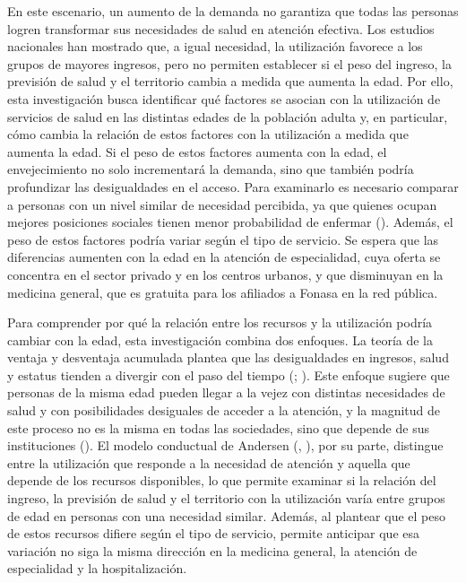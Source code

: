 \documentclass[
  spanish,
  a4paper,
  oneside]{scrbook}
\begin{document}
En este escenario, un aumento de la demanda no garantiza que todas las
personas logren transformar sus necesidades de salud en atención
efectiva. Los estudios nacionales han mostrado que, a igual necesidad,
la utilización favorece a los grupos de mayores ingresos, pero no
permiten establecer si el peso del ingreso, la previsión de salud y el
territorio cambia a medida que aumenta la edad. Por ello, esta
investigación busca identificar qué factores se asocian con la
utilización de servicios de salud en las distintas edades de la
población adulta y, en particular, cómo cambia la relación de estos
factores con la utilización a medida que aumenta la edad. Si el peso de
estos factores aumenta con la edad, el envejecimiento no solo
incrementará la demanda, sino que también podría profundizar las
desigualdades en el acceso. Para examinarlo es necesario comparar a
personas con un nivel similar de necesidad percibida, ya que quienes
ocupan mejores posiciones sociales tienen menor probabilidad de enfermar
(). Además, el peso de estos factores podría variar según el
tipo de servicio. Se espera que las diferencias aumenten con la edad en
la atención de especialidad, cuya oferta se concentra en el sector
privado y en los centros urbanos, y que disminuyan en la medicina
general, que es gratuita para los afiliados a Fonasa en la red pública.

Para comprender por qué la relación entre los recursos y la utilización
podría cambiar con la edad, esta investigación combina dos enfoques. La
teoría de la ventaja y desventaja acumulada plantea que las
desigualdades en ingresos, salud y estatus tienden a divergir con el
paso del tiempo (; ).
Este enfoque sugiere que personas de la misma edad pueden llegar a la
vejez con distintas necesidades de salud y con posibilidades desiguales
de acceder a la atención, y la magnitud de este proceso no es la misma
en todas las sociedades, sino que depende de sus instituciones
(). El modelo
conductual de Andersen (,
), por su parte, distingue
entre la utilización que responde a la necesidad de atención y aquella
que depende de los recursos disponibles, lo que permite examinar si la
relación del ingreso, la previsión de salud y el territorio con la
utilización varía entre grupos de edad en personas con una necesidad
similar. Además, al plantear que el peso de estos recursos difiere según
el tipo de servicio, permite anticipar que esa variación no siga la
misma dirección en la medicina general, la atención de especialidad y la
hospitalización.
\end{document}
